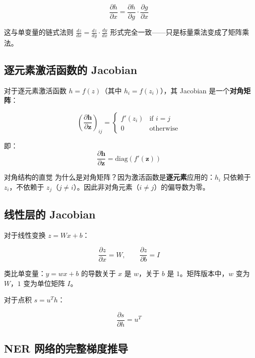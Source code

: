 \documentclass[a4paper]{article}
\begin{document}
$$\frac{\partial h}{\partial x} = \frac{\partial h}{\partial g} \cdot \frac{\partial g}{\partial x}$$

这与单变量的链式法则 $\frac{dz}{dx} = \frac{dz}{dy} \cdot \frac{dy}{dx}$ 形式完全一致——只是标量乘法变成了矩阵乘法。





\subsection{逐元素激活函数的 Jacobian}

对于逐元素激活函数 $h = f(z)$（其中 $h_i = f(z_i)$），其 Jacobian 是一个\textbf{对角矩阵}：





$$\left(\frac{\partial \mathbf{h}}{\partial \mathbf{z}}\right)_{ij} = \begin{cases} f'(z_i) & \text{if } i = j \\ 0 & \text{otherwise} \end{cases}$$

即：
$$\frac{\partial \mathbf{h}}{\partial \mathbf{z}} = \text{diag}(f'(\mathbf{z}))$$

\begin{importantbox}{对角结构的直觉}
为什么是对角矩阵？因为激活函数是\textbf{逐元素}应用的：$h_i$ 只依赖于 $z_i$，不依赖于 $z_j$（$j \neq i$）。因此非对角元素（$i \neq j$）的偏导数为零。
\end{importantbox}

\subsection{线性层的 Jacobian}

对于线性变换 $z = Wx + b$：

$$\frac{\partial z}{\partial x} = W, \qquad \frac{\partial z}{\partial b} = I$$

类比单变量：$y = wx + b$ 的导数关于 $x$ 是 $w$，关于 $b$ 是 $1$。矩阵版本中，$w$ 变为 $W$，$1$ 变为单位矩阵 $I$。

对于点积 $s = u^T h$：

$$\frac{\partial s}{\partial h} = u^T$$





\subsection{NER 网络的完整梯度推导}
\end{document}
